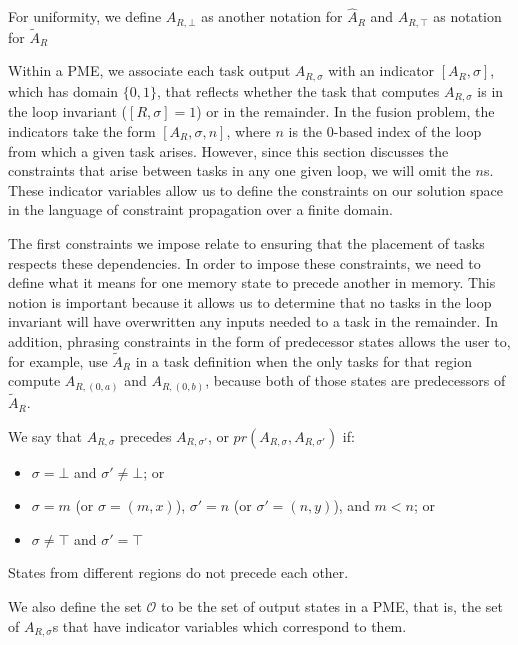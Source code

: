 \documentclass[12pt,letterpaper]{article}
\newcommand*{\outputs}{\mathcal{O}}
\begin{document}
For uniformity, we define $A_{R, \bot}$ as another notation for $\hat{A}_R$ and $A_{R, \top}$ as notation for $\widetilde{A}_R$

Within a PME, we associate each task output $A_{R, \sigma}$ with an indicator $[A_R, \sigma]$, which has domain $\{0, 1\}$, that reflects whether the task that computes $A_{R, \sigma}$ is in the loop invariant ($[R, \sigma] = 1$) or in the remainder.
In the fusion problem, the indicators take the form $[A_R, \sigma, n]$, where $n$ is the 0-based index of the loop from which a given task arises.
However, since this section discusses the constraints that arise between tasks in any one given loop, we will omit the $n$s.
These indicator variables allow us to define the constraints on our solution space in the language of constraint propagation over a finite domain.

The first constraints we impose relate to ensuring that the placement of tasks respects these dependencies.
In order to impose these constraints, we need to define what it means for one memory state to precede another in memory.
This notion is important because it allows us to determine that no tasks in the loop invariant will have overwritten any inputs needed to a task in the remainder.
In addition, phrasing constraints in the form of predecessor states allows the user to, for example, use $\widetilde{A}_R$ in a task definition when the only tasks for that region compute $A_{R, (0, a)}$ and $A_{R, (0, b)}$, because both of those states are predecessors of $\widetilde{A}_R$.

We say that $A_{R, \sigma}$ precedes $A_{R, \sigma'}$, or $pr(A_{R, \sigma}, A_{R, \sigma'})$ if:
\begin{itemize}
\item $\sigma = \bot$ and $\sigma' \neq \bot$; or
\item $\sigma = m$ (or $\sigma = (m, x)$), $\sigma' = n$ (or $\sigma' = (n, y)$), and $m < n$; or
\item $\sigma \neq \top$ and $\sigma' = \top$
\end{itemize}
States from different regions do not precede each other.

We also define the set $\outputs$ to be the set of output states in a PME, that is, the set of $A_{R, \sigma}$s that have indicator variables which correspond to them.
\end{document}
